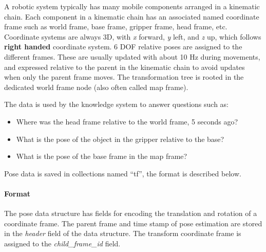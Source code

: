 
A robotic system typically has many mobile components arranged in a kinematic chain.
Each component in a kinematic chain has an associated named coordinate frame such as
world frame, base frame, gripper frame, head frame, etc.
Coordinate systems are always 3D, with \emph{x} forward, \emph{y} left, and \emph{z} up, which follows \textbf{right handed} coordinate system.
6 DOF relative poses are assigned to the different frames.
These are usually updated with about 10 Hz during movements, and
expressed relative to the 
parent in the kinematic chain to avoid updates when only the parent frame moves.
The transformation tree is rooted in the dedicated world frame node
(also often called map frame).

The data is used by the \ease knowledge system to answer questions such as:
\begin{itemize}
 \item Where was the head frame relative to the world frame, 5 seconds ago?
 \item What is the pose of the object in the gripper relative to the base?
 \item What is the pose of the base frame in the map frame? 
\end{itemize}


Pose data is saved in \mongodb collections named ``tf'', the format is described below.

\paragraph{Format}
The pose data structure has
fields for encoding the translation and rotation of a coordinate frame.
The parent frame and time stamp of pose estimation
are stored in the \emph{header} field of the data structure.
The transform coordinate frame is assigned to the \emph{child\_frame\_id} field. \\



